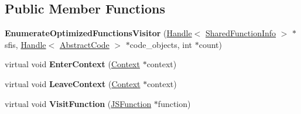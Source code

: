 \subsection*{Public Member Functions}
\begin{DoxyCompactItemize}
\item 
{\bfseries Enumerate\+Optimized\+Functions\+Visitor} (\hyperlink{classv8_1_1internal_1_1_handle}{Handle}$<$ \hyperlink{classv8_1_1internal_1_1_shared_function_info}{Shared\+Function\+Info} $>$ $\ast$sfis, \hyperlink{classv8_1_1internal_1_1_handle}{Handle}$<$ \hyperlink{classv8_1_1internal_1_1_abstract_code}{Abstract\+Code} $>$ $\ast$code\+\_\+objects, int $\ast$count)\hypertarget{classv8_1_1internal_1_1_enumerate_optimized_functions_visitor_a997b951cd055a18ea6bb6a08517d5949}{}\label{classv8_1_1internal_1_1_enumerate_optimized_functions_visitor_a997b951cd055a18ea6bb6a08517d5949}

\item 
virtual void {\bfseries Enter\+Context} (\hyperlink{classv8_1_1internal_1_1_context}{Context} $\ast$context)\hypertarget{classv8_1_1internal_1_1_enumerate_optimized_functions_visitor_ad77518ea6c427f1e07b38fa55b73dadd}{}\label{classv8_1_1internal_1_1_enumerate_optimized_functions_visitor_ad77518ea6c427f1e07b38fa55b73dadd}

\item 
virtual void {\bfseries Leave\+Context} (\hyperlink{classv8_1_1internal_1_1_context}{Context} $\ast$context)\hypertarget{classv8_1_1internal_1_1_enumerate_optimized_functions_visitor_a1821ab118e0a7030801ee3b75f699f77}{}\label{classv8_1_1internal_1_1_enumerate_optimized_functions_visitor_a1821ab118e0a7030801ee3b75f699f77}

\item 
virtual void {\bfseries Visit\+Function} (\hyperlink{classv8_1_1internal_1_1_j_s_function}{J\+S\+Function} $\ast$function)\hypertarget{classv8_1_1internal_1_1_enumerate_optimized_functions_visitor_a72a2b7ddfe10eccf5991f66313be44fd}{}\label{classv8_1_1internal_1_1_enumerate_optimized_functions_visitor_a72a2b7ddfe10eccf5991f66313be44fd}

\end{DoxyCompactItemize}
